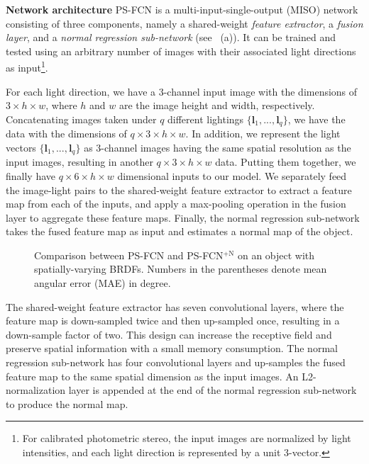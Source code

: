 \documentclass[10pt,journal,compsoc]{IEEEtran}
\newcommand{\vl}{\boldsymbol{l}}
\renewcommand{\paragraph}[1]{\vspace{0.2em}\noindent \textbf{#1 \hspace{0.2em}}}
\begin{document}
\paragraph{Network architecture}
PS-FCN is a multi-input-single-output (MISO) network consisting of three components, namely a shared-weight {\em feature extractor}, a {\em fusion layer}, and a {\em normal regression sub-network} (see ~(a)). It can be trained and tested using an arbitrary number of images with their associated light directions as input\footnote{For calibrated photometric stereo, the input images are normalized by light intensities, and each light direction is represented by a unit $3$-vector.}.

For each light direction, we have a $3$-channel input image with the dimensions of $3 \times h \times w$, where $h$ and $w$ are the image height and width, respectively. Concatenating images taken under $q$ different lightings $\{\vl_1, ..., \vl_q\}$, we have the data with the dimensions of $q \times 3 \times h \times w$. In addition, we represent the light vectors $\{\vl_1, ..., \vl_q\}$ as $3$-channel images having the same spatial resolution as the input images, resulting in another $q \times 3 \times h \times w$ data. Putting them together, we finally have $q \times 6 \times h \times w$ dimensional inputs to our model.
We separately feed the image-light pairs to the shared-weight feature extractor to extract a feature map from each of the inputs, and apply a max-pooling operation in the fusion layer to aggregate these feature maps. Finally, the normal regression sub-network takes the fused feature map as input and estimates a normal map of the object.

\begin{figure}[t] \centering
    
    \caption{Comparison between PS-FCN and PS-FCN$^{+\text{N}}$ on an object with spatially-varying BRDFs. Numbers in the parentheses denote mean angular error (MAE) in degree.} \label{fig:cat_SVBRDF}
\end{figure}
The shared-weight feature extractor has seven convolutional layers, where the feature map is down-sampled twice and then up-sampled once, resulting in a down-sample factor of two. This design can increase the receptive field and preserve spatial information with a small memory consumption. 
The normal regression sub-network has four convolutional layers and up-samples the fused feature map to the same spatial dimension as the input images. An L2-normalization layer is appended at the end of the normal regression sub-network to produce the normal map.
\end{document}

